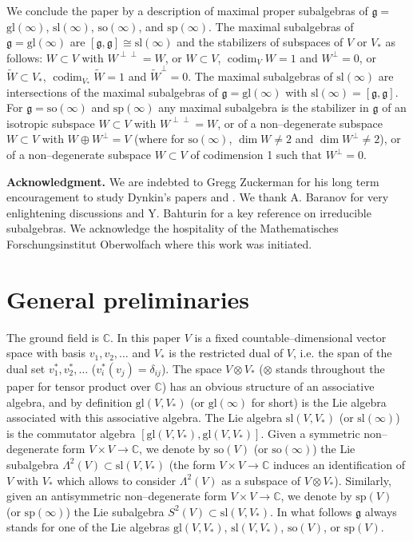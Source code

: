 \documentclass[oneside,leqno,12pt]{article}
\def\gg{\mathfrak{g}}
\def\C{\mathbb{C}}
\DeclareMathOperator{\codim}{codim}
\newcommand {\CC} {\mathbb {C}}
\renewcommand{\gg}{\mathfrak{g}}
\renewcommand{\sp}{\mathrm{sp}}
\newcommand{\gl}{\mathrm{gl}}
\renewcommand{\sl}{\mathrm{sl}}
\newcommand{\so}{\mathrm{so}}
\begin{document}
We conclude the paper by a description of maximal proper subalgebras of $\gg=$ $\gl(\infty)$, $\sl(\infty)$, 
$\so(\infty)$, and $\sp(\infty)$. The maximal subalgebras of $\gg=\gl(\infty)$ are $[\gg, \gg] \cong \sl(\infty)$
and the stabilizers of subspaces of $V$ or $V_*$ as follows: $W \subset V$ with $W^{\perp\perp} = W$, or
$W \subset V$, $\codim_V W = 1$ and $W^\perp = 0$, or $\tilde{W} \subset V_*$, $\codim_{V_*} \tilde{W} = 1$ and 
$\tilde{W}^\perp = 0$. The maximal subalgebras of $\sl(\infty)$ are intersections of the maximal subalgebras of
$\gg = \gl(\infty)$ with $\sl(\infty) =[\gg, \gg]$.
For $\gg=\so(\infty)$ and $\sp(\infty)$ any maximal subalgebra is the stabilizer in $\gg$ of an isotropic subspace $W \subset V$ with $W^{\perp \perp} = W$, 
or of a non--degenerate subspace $W \subset V$ with $W \oplus W^\perp = V$ (where for $\so(\infty)$, $\dim W \neq 2$ and $\dim W^\perp \neq 2$), 
or of a non--degenerate subspace $W \subset V$ of codimension 1 such that $W^\perp = 0$.

\noindent
{\bf Acknowledgment.} We are indebted to Gregg Zuckerman for his long term encouragement to study Dynkin's papers 
\cite{Dy1} and \cite{Dy2}. 
We thank A. Baranov for very enlightening discussions and Y. Bahturin for a key reference on irreducible 
subalgebras. We acknowledge the hospitality of the Mathematisches Forschungsinstitut Oberwolfach 
where this work was initiated.



\section{General preliminaries}
The ground field is $\CC$. In this paper $V$ is a fixed countable--dimensional vector space with basis $v_1,v_2,\dots$ and $V_*$ is the restricted dual of $V$, i.e. the span of the dual set $v_1^*,v_2^*,\dots$ ($v_i^*(v_j)=\delta_{ij}$). The space $V\otimes V_*$ ($\otimes$ stands throughout the paper for 
tensor product over $\C$) has an obvious structure of an associative algebra, and by definition $\gl(V, V_*)$ (or $\gl(\infty)$ for short) is the Lie algebra associated with this associative algebra. The Lie algebra $\sl(V, V_*)$ (or $\sl(\infty)$) is  the commutator algebra $[\gl(V,V_*), \gl(V,V_*)]$.
 Given a symmetric non--degenerate form $V\times V\to\CC$, we denote by $\so(V)$ (or $\so(\infty)$) the Lie subalgebra $\Lambda^2(V)\subset\sl(V,V_*)$ (the form $V\times V\to\CC$ induces an identification of $V$ with $V_*$ which allows to consider $\Lambda^2(V)$ as a subspace of $V\otimes V_*$). Similarly, given an antisymmetric non--degenerate form $V\times V\to\CC$, we denote by $\sp(V)$ (or $\sp(\infty)$) the Lie subalgebra $S^2(V)\subset\sl(V,V_*)$. In what follows $\gg$ always stands for
one of the Lie algebras $\gl(V,V_*)$, $\sl(V,V_*)$, $\so(V)$, or $\sp(V)$.
\end{document}
